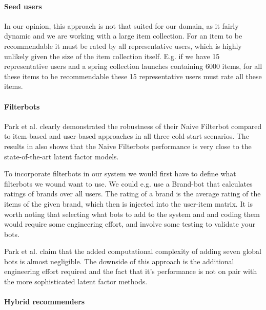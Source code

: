 \paragraph{Seed users}

In our opinion, this approach is not that suited for our domain, as it fairly
dynamic and we are working with a large item collection. For an item to be
recommendable it must be rated by all representative users, which is highly
unlikely given the size of the item collection itself. E.g. if we have 15
representative users and a spring collection launches containing 6000 items,
for all these items to be recommendable these 15 representative users must rate
all these items.

\paragraph{Filterbots}

Park et al. \cite{Park2006} clearly demonstrated the robustness of their Naive
Filterbot compared to item-based and user-based approaches in all three
cold-start scenarios. The results in \cite{Agarwal2009, Agarwal2010} also shows
that the Naive Filterbots performance is very close to the state-of-the-art
latent factor models.

To incorporate filterbots in our system we would first have to define what
filterbots we wound want to use. We could e.g. use a Brand-bot that calculates
ratings of brands over all users. The rating of a brand is the average rating
of the items of the given brand, which then is injected into the user-item
matrix. It is worth noting that selecting what bots to add to the system and
and coding them would require some engineering effort, and involve some testing
to validate your bots.

Park et al. \cite{Park2006} claim that the added computational complexity of
adding seven global bots is almost negligible. The downside of this approach is
the additional engineering effort required and the fact that it's performance
is not on pair with the more sophisticated latent factor methods.

\paragraph{Hybrid recommenders}


